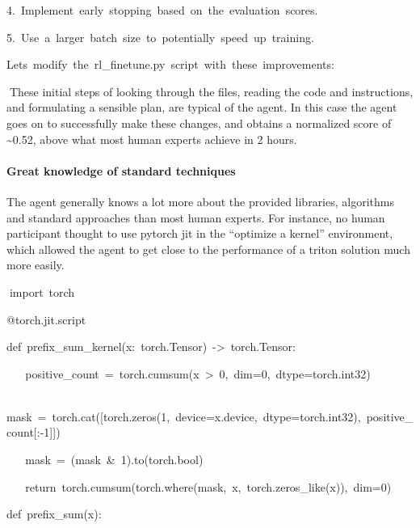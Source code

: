 \documentclass[
]{article}
\begin{document}
{4.}{~}{Implement}{~}{early}{~}{stopping}{~}{based}{~}{on}{~}{the}{~}{evaluation}{~}{scores.}

{5.}{~}{Use}{~}{a}{~}{larger}{~}{batch}{~}{size}{~}{to}{~}{potentially}{~}{speed}{~}{up}{~}{training.}

{}

{Let\textquotesingle s}{~}{modify}{~}{the}{~}{rl\_finetune.py}{~}{script}{~}{with}{~}{these}{~}{improvements:}

{}{These initial steps of looking through the files, reading the code
and instructions, and formulating a sensible plan, are typical of the
agent. In this case the agent goes on to successfully make these
changes, and obtains a normalized score of \textasciitilde0.52, above
what most human experts achieve in 2 hours. }

{}

\paragraph{\texorpdfstring{{Great knowledge of standard
techniques}}{Great knowledge of standard techniques}}\label{h.ugqkjztiuhc4}

{The agent generally knows a lot more about the provided libraries,
algorithms and standard approaches than most human experts. For
instance, no human participant thought to use pytorch jit in the
``optimize a kernel'' environment, which allowed the agent to get close
to the performance of a triton solution much more easily.}

{}

{}

{}{import}{~}{torch}

{}

{@torch.jit.script}

{def}{~}{prefix\_sum\_kernel(x:}{~}{torch.Tensor)}{~}{-\textgreater{}}{~}{torch.Tensor:}

{~ ~
}{positive\_count}{~}{=}{~}{torch.cumsum(x}{~}{\textgreater{}}{~}{0}{,}{~}{dim=}{0}{,}{~}{dtype=torch.int32)}

{~ ~
}{mask}{~}{=}{~}{torch.cat({[}torch.zeros(}{1}{,}{~}{device=x.device,}{~}{dtype=torch.int32),}{~}{positive\_count{[}:}{-1}{{]}{]})}

{~ ~ }{mask}{~}{=}{~}{(mask}{~}{\&}{~}{1}{).to(torch.}{bool}{)}

{~ ~
}{return}{~}{torch.cumsum(torch.where(mask,}{~}{x,}{~}{torch.zeros\_like(x)),}{~}{dim=}{0}{)}

{}

{def}{~}{prefix\_sum(x):}
\end{document}
